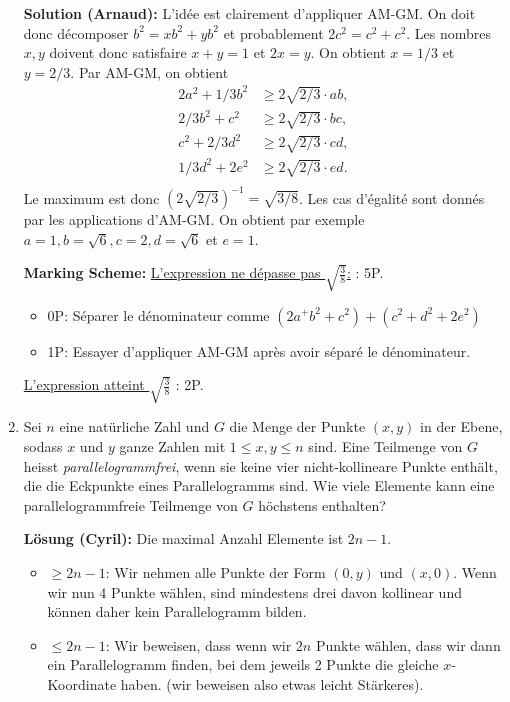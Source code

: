 \documentclass[language=german,style=solution]{smo}
\begin{document}
\begin{enumerate}[label=\textbf{\arabic*.}]
\textbf{Solution (Arnaud):} L'idée est clairement d'appliquer AM-GM. On doit donc décomposer $b^2=xb^2+yb^2$ et probablement $2c^2=c^2+c^2$. Les nombres $x,y$ doivent donc satisfaire $x+y=1$ et $2x=y$. On obtient $x=1/3$ et $y=2/3$. Par AM-GM, on obtient
\begin{align*}
2a^2+1/3b^2&\geq 2\sqrt{2/3}\cdot ab,\\
2/3b^2+c^2&\geq 2\sqrt{2/3}\cdot bc,\\
c^2+2/3d^2&\geq 2\sqrt{2/3}\cdot cd,\\
1/3d^2+2e^2&\geq 2\sqrt{2/3}\cdot ed.\\
\end{align*}
Le maximum est donc $(2\sqrt{2/3})^{-1}=\sqrt{3/8}$. Les cas d'égalité sont donnés par les applications d'AM-GM. On obtient par exemple $a=1,b=\sqrt{6},c=2,d=\sqrt{6}$ et $e=1$.

\textbf{Marking Scheme:}
\underline{L'expression ne dépasse pas $\sqrt{\frac{3}{8}}$:} : 5P.
\begin{itemize}
	\item 0P: Séparer le dénominateur comme $(2a^+b^2+c^2) + (c^2+d^2+2e^2)$
	\item 1P: Essayer d'appliquer AM-GM après avoir séparé le dénominateur.
\end{itemize}
\underline{L'expression atteint $\sqrt{\frac{3}{8}}$} : 2P.


\newpage

\item Sei $n$ eine natürliche Zahl und $G$ die Menge der Punkte $(x,y)$ in der Ebene, sodass $x$ und $y$ ganze Zahlen mit $1\leq x,y \leq n$ sind. Eine Teilmenge von $G$ heisst \textit{parallelogrammfrei}, wenn sie keine vier nicht-kollineare Punkte enthält, die die Eckpunkte eines Parallelogramms sind. Wie viele Elemente kann eine parallelogrammfreie Teilmenge von $G$ höchstens enthalten?

\textbf{Lösung (Cyril):}
Die maximal Anzahl Elemente ist $2n-1$. 

\begin{itemize}
\item \textbf{$\geq 2n-1$}: Wir nehmen alle Punkte der Form $(0,y)$ und $(x,0)$. Wenn wir nun 4 Punkte wählen, sind mindestens drei davon kollinear und können daher kein Parallelogramm bilden.
\item \textbf{$\leq 2n-1$}: Wir beweisen, dass wenn wir $2n$ Punkte wählen, dass wir dann ein Parallelogramm finden, bei dem jeweils 2 Punkte die gleiche $x$-Koordinate haben. (wir beweisen also etwas leicht Stärkeres).


\end{itemize}
\end{enumerate}
\end{document}
